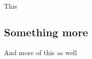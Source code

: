 \documentclass[../main.tex]{subfiles}
\begin{document}
This
\subsection{Something more}
And more of this as well
\end{document}

